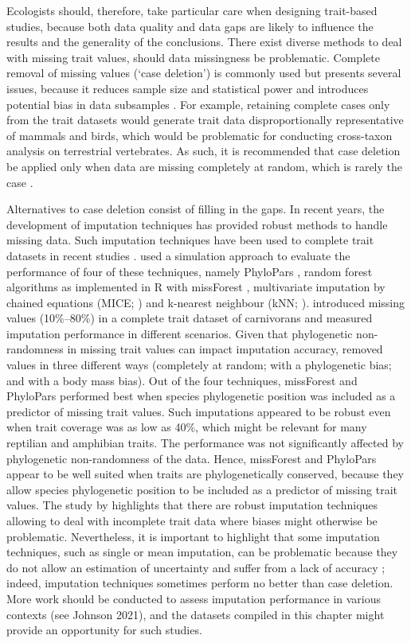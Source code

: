 Ecologists should, therefore, take particular care when designing trait-based studies, because both data quality and data gaps are likely to influence the results and the generality of the conclusions. There exist diverse methods to deal with missing trait values, should data missingness be problematic. Complete removal of missing values (`case deletion') is commonly used but presents several issues, because it reduces sample size and statistical power and introduces potential bias in data subsamples \citep{Nakagawa2008}. For example, retaining complete cases only from the trait datasets would generate trait data disproportionally representative of mammals and birds, which would be problematic for conducting cross-taxon analysis on terrestrial vertebrates. As such, it is recommended that case deletion be applied only when data are missing completely at random, which is rarely the case \citep{Peugh2004}.

Alternatives to case deletion consist of filling in the gaps. In recent years, the development of imputation techniques has provided robust methods to handle missing data. Such imputation techniques have been used to complete trait datasets in recent studies \citep{Cooke2019b}. \citet{Penone2014} used a simulation approach to evaluate the performance of four of these techniques, namely PhyloPars \citep{Bruggeman2009}, random forest algorithms as implemented in R with missForest \citep{Stekhoven2016, Stekhoven2012}, multivariate imputation by chained equations (MICE; \citet{micepackage}) and k-nearest neighbour (kNN; \citet{Troyanskaya2001}). \citet{Penone2014} introduced missing values (10\%–80\%) in a complete trait dataset of carnivorans and measured imputation performance in different scenarios. Given that phylogenetic non-randomness in missing trait values can impact imputation accuracy, \citet{Penone2014} removed values in three different ways (completely at random; with a phylogenetic bias; and with a body mass bias). Out of the four techniques, missForest and PhyloPars performed best when species phylogenetic position was included as a predictor of missing trait values. Such imputations appeared to be robust even when trait coverage was as low as 40\%, which might be relevant for many reptilian and amphibian traits. The performance was not significantly affected by phylogenetic non-randomness of the data. Hence, missForest and PhyloPars appear to be well suited when traits are phylogenetically conserved, because they allow species phylogenetic position to be included as a predictor of missing trait values. The study by \citet{Penone2014} highlights that there are robust imputation techniques allowing to deal with incomplete trait data where biases might otherwise be problematic. Nevertheless, it is important to highlight that some imputation techniques, such as single or mean imputation, can be problematic because they do not allow an estimation of uncertainty and suffer from a lack of accuracy \citep{Nakagawa2008}; indeed, imputation techniques sometimes perform no better than case deletion. More work should be conducted to assess imputation performance in various contexts (see Johnson 2021), and the datasets compiled in this chapter might provide an opportunity for such studies.

